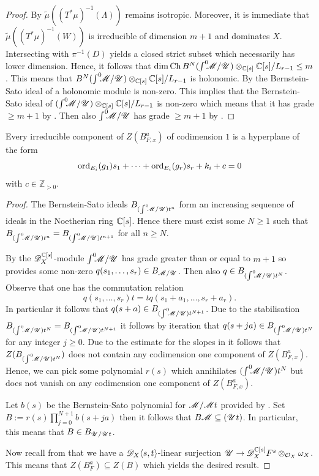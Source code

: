 \begin{proof}
  By  $\widetilde{\mu}((T^*\mu)^{-1}(\Lambda))$ remains isotropic.
  Moreover, it is immediate that $\widetilde{\mu}((T^*\mu)^{-1}(W))$ is irreducible of dimension $m+1$ and dominates $X$.
  Intersecting with $\pi^{-1}(D)$ yields a closed strict subset which necessarily has lower dimension.
  Hence, it follows that $\dim \operatorname{Ch} B^N (\int^0 \mkern -8mu\mathscr{M}/\allowbreak \mathscr{U})\otimes_{\mathbb{C}[s]}\mathbb{C}[s]/L_{r-1} \leq m$.
  This means that $B^N(\int^0 \mkern -8mu\mathscr{M}/ \mathscr{U})\otimes_{\mathbb{C}[s]}\mathbb{C}[s]/L_{r-1}$ is holonomic.
  By  the Bernstein-Sato ideal of a holonomic module is non-zero.
  This implies that the Bernstein-Sato ideal of $(\int^0 \mkern -8mu\mathscr{M}/ \mathscr{U})\otimes_{\mathbb{C}[s]}\mathbb{C}[s]/L_{r-1}$ is non-zero which means that it has grade $\geq m+1$ by .
  Then also $\int^0 \mkern -8mu\mathscr{M}/\mathscr{U}$ has grade $\geq m+1$ by .
  \end{proof}
  \begin{theorem}\label{thm: EstimateBernsteinSatoZeroLocust}
  Every irreducible component of $Z(B_{F,x}^a)$ of codimension $1$ is a hyperplane of the form
  $$\operatorname{ord}_{E_i}(g_1) s_1 + \cdots + \operatorname{ord}_{E_i}(g_r)s_r + k_i + c=0$$
  with $c \in \mathbb{Z}_{> 0 }$.
\end{theorem}
\begin{proof}
  The Bernstein-Sato ideals $B_{(\int^0 \mkern -8mu\mathscr{M}/\mathscr{U})t^n}$ form an increasing sequence of ideals in the Noetherian ring $\mathbb{C}[s]$.
  Hence there must exist some $N\geq 1$ such that $B_{(\int^0 \mkern -8mu\mathscr{M}/\mathscr{U})t^n} = B_{(\int^0 \mkern -8mu\mathscr{M}/\mathscr{U})t^{n+1}}$ for all $n\geq N$.

  By  the $\mathscr{D}_X^{\mathbb{C}[s]}$-module $\int^0 \mkern -8mu\mathscr{M}/\mathscr{U}$ has grade greater than or equal to $m + 1$ so  provides some non-zero $q(s_1,\ldots,s_r) \in B_{\mathscr{M}/\mathscr{U}}$.
	Then also $q\in B_{(\int^0 \mkern -8mu\mathscr{M}/\mathscr{U})t^N}$.
  Observe that one has the commutation relation
  $$q(s_1,\ldots,s_r)t = tq(s_1+a_1,\ldots, s_r + a_r).$$
  In particular it follows that $q(s + a)\in B_{(\int^0 \mkern -8mu\mathscr{M}/\mathscr{U})t^{N+1}}$.
  Due to the stabilisation $B_{(\int^0 \mkern -8mu\mathscr{M}/\mathscr{U})t^N} = B_{(\int^0 \mkern -8mu\mathscr{M}/\mathscr{U})t^{N+1}}$ it follows by iteration that $q(s+ja)\in B_{(\int^0 \mkern -8mu\mathscr{M}/\mathscr{U})t^N}$ for any integer $j\geq 0$.
  Due to the estimate for the slopes in  it follows that $Z(B_{(\int^0 \mkern -8mu\mathscr{M}/\mathscr{U})t^N})$ does not contain any codimension one component of $Z(B_{F,x}^a)$.
  Hence, we can pick some polynomial $r(s)$ which annihilates $(\int^0 \mkern -8mu\mathscr{M}/\mathscr{U})t^N$ but does not vanish on any codimension one component of $Z(B_{F,x}^a)$.

  Let $b(s)$ be the Bernstein-Sato polynomial for $\mathscr{M}/\mathscr{M} t$ provided by .
  Set $B := r(s)\prod_{j=0}^{N+1} b(s+ ja)$ then it follows that $B\mathscr{M} \subseteq (\mathscr{U} t)$.
  In particular, this means that $B\in B_{\mathscr{U}/\mathscr{U} t}$.

	Now recall from  that we have a $\mathscr{D}_X\langle s,t\rangle$-linear surjection $\mathscr{U} \to \mathscr{D}_X^{\mathbb{C}[s]}F^s \otimes_{\mathcal{O}_X}\omega_X$.
	This means that $Z(B_F^a)\subseteq Z(B)$ which yields the desired result.
\end{proof}

